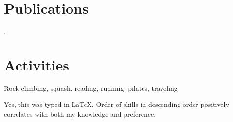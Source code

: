 \documentclass[10pt]{article}
\begin{document}


\section*{Publications}
.

\section*{Activities}
Rock climbing, squash, reading, running, pilates, traveling


{\vfill
\scriptsize\hfill Yes, this was typed in \LaTeX. Order of skills in descending order positively correlates with both my knowledge and preference.}

\end{document}
